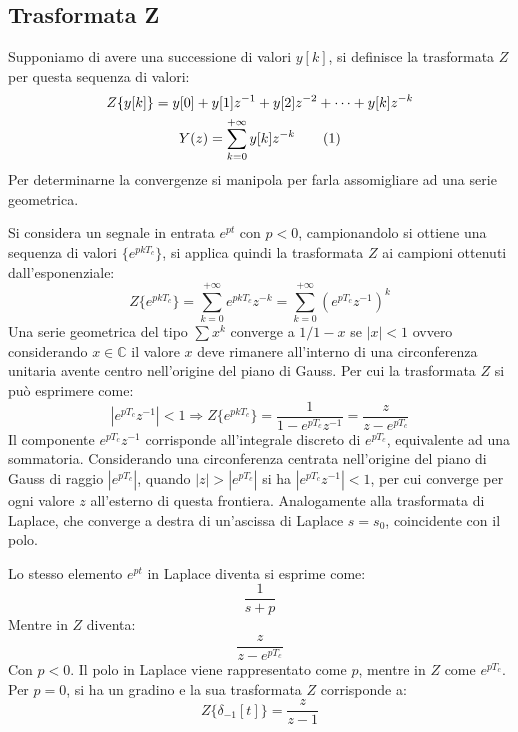 \documentclass{article}
\numberwithin{equation}{subsection}
\newcommand{\tageq}{\tag{\stepcounter{equation}\theequation}}
\begin{document}
\subsection{Trasformata Z}

Supponiamo di avere una successione di valori $y[k]$, si definisce la trasformata $Z$ per questa sequenza di valori:
\begin{gather*}
    Z\{y[k]\}=y[0]+y[1]z^{-1}+y[2]z^{-2}+\cdots+y[k]z^{-k}\\
    Y(z)=\sum_{k=0}^{+\infty}y[k]z^{-k}\tageq
\end{gather*}
Per determinarne la convergenze si manipola per farla assomigliare ad una serie geometrica. 

Si considera un segnale in entrata $e^{pt}$ con $p<0$, campionandolo si ottiene una sequenza di valori $\{e^{pkT_c}\}$, si applica quindi la trasformata $Z$ ai campioni 
ottenuti dall'esponenziale:
\begin{equation*}
    Z\{e^{pkT_c}\}=\sum_{k=0}^{+\infty}e^{pkT_c}z^{-k}=\sum_{k=0}^{+\infty}\left(e^{pT_c}z^{-1}\right)^k
\end{equation*}
Una serie geometrica del tipo $\sum x^k$ converge a ${1}/{1-x}$ se $|x|<1$ ovvero considerando $x\in\mathbb{C}$ il valore $x$ deve rimanere all'interno 
di una circonferenza unitaria avente centro nell'origine del piano di Gauss. Per cui la trasformata $Z$ si può esprimere come: 
\begin{equation}
    |e^{pT_c}z^{-1}|<1\Rightarrow Z\{e^{pkT_c}\}=\displaystyle\frac{1}{1-e^{pT_c}z^{-1}}=\frac{z}{z-e^{pT_c}}
\end{equation}
Il componente $e^{pT_c}z^{-1}$ corrisponde all'integrale discreto di $e^{pT_c}$, equivalente ad una sommatoria. Considerando una circonferenza centrata nell'origine 
del piano di Gauss di raggio $|e^{pT_c}|$, quando $|z|>|e^{pT_c}|$ si ha $|e^{pT_c}z^{-1}|<1$, per cui converge per ogni valore $z$ all'esterno di questa frontiera. 
Analogamente alla trasformata di Laplace, che converge a destra di un'ascissa di Laplace $s=s_0$, coincidente con il polo. 

Lo stesso elemento $e^{pt}$ in Laplace diventa si esprime come: 
\begin{equation*}
    \displaystyle\frac{1}{s+p} 
\end{equation*}    
Mentre in $Z$ diventa:
\begin{equation*}
    \displaystyle\frac{z}{z-e^{pT_c}}
\end{equation*}
Con $p<0$. Il polo in Laplace 
viene rappresentato come $p$, mentre in $Z$ come $e^{pT_c}$. Per $p=0$, si ha un gradino e la sua trasformata $Z$ corrisponde a:
\begin{equation}
    Z\{\delta_{-1}[t]\}=\displaystyle\frac{z}{z-1}
\end{equation}
\end{document}
